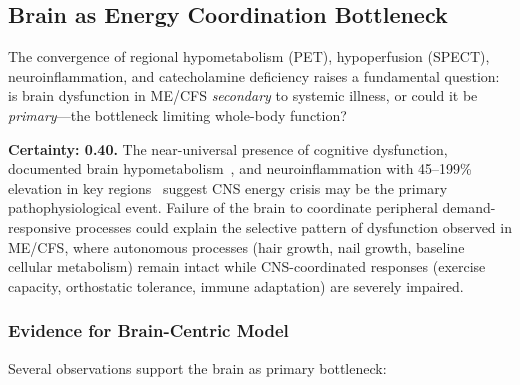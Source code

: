 \subsection{Brain as Energy Coordination Bottleneck}
\label{sec:brain-bottleneck}

The convergence of regional hypometabolism (PET), hypoperfusion (SPECT), neuroinflammation, and catecholamine deficiency raises a fundamental question: is brain dysfunction in ME/CFS \emph{secondary} to systemic illness, or could it be \emph{primary}---the bottleneck limiting whole-body function?

\begin{speculation}
\label{spec:cns-primary}
\textbf{Certainty: 0.40.} The near-universal presence of cognitive dysfunction, documented brain hypometabolism~\cite{Chaudhuri2004fatigue}, and neuroinflammation with 45--199\% elevation in key regions~\cite{Nakatomi2014neuroinflammation} suggest CNS energy crisis may be the primary pathophysiological event. Failure of the brain to coordinate peripheral demand-responsive processes could explain the selective pattern of dysfunction observed in ME/CFS, where autonomous processes (hair growth, nail growth, baseline cellular metabolism) remain intact while CNS-coordinated responses (exercise capacity, orthostatic tolerance, immune adaptation) are severely impaired.
\end{speculation}

\subsubsection{Evidence for Brain-Centric Model}

Several observations support the brain as primary bottleneck:

